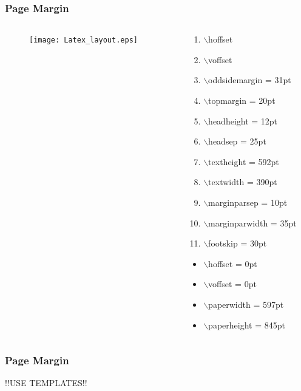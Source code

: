 \documentclass [9pt] {beamer}
\begin{document}
\begin{frame}\frametitle{Page Margin}
\rm
\fontsize{9pt}{11pt}\selectfont

\begin{columns}
	\begin{column}{6cm}
		\begin{figure}[h!]
			\texttt{[image: Latex\_layout.eps]}
		\end{figure}
	\end{column}
\begin{column}{4cm}
\footnotesize
\begin{enumerate}
	\item  $\backslash$hoffset
	\item  $\backslash$voffset
	\item $\backslash$oddsidemargin = 31pt
	\item $\backslash$topmargin = 20pt
	\item $\backslash$headheight = 12pt
	\item $\backslash$headsep = 25pt
	\item $\backslash$textheight = 592pt
	\item $\backslash$textwidth = 390pt
	\item $\backslash$marginparsep = 10pt
	\item $\backslash$marginparwidth = 35pt
	\item $\backslash$footskip = 30pt
\end{enumerate}

\begin{itemize}
	\item $\backslash$hoffset = 0pt
	\item $\backslash$voffset = 0pt
	\item  $\backslash$paperwidth = 597pt
	\item $\backslash$paperheight = 845pt
\end{itemize}

\end{column}
\end{columns}
\end{frame}



\begin{frame}\frametitle{Page Margin}
\rm
\fontsize{9pt}{11pt}\selectfont
\begin{center}
	\Huge \textcolor[rgb]{0.98,0.00,0.00}{!!USE TEMPLATES!!}
\end{center}
\end{frame}
\end{document}
